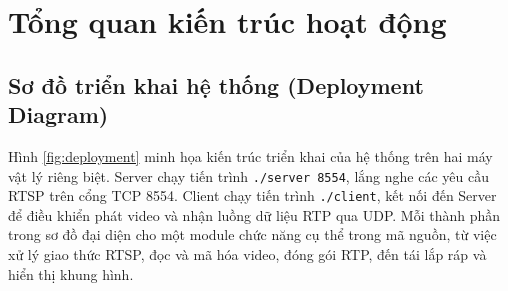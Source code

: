\section{Tổng quan kiến trúc hoạt động}

\subsection{Sơ đồ triển khai hệ thống (Deployment Diagram)}

Hình \ref{fig:deployment} minh họa kiến trúc triển khai của hệ thống trên hai máy vật lý riêng biệt. Server chạy tiến trình \texttt{./server 8554}, lắng nghe các yêu cầu RTSP trên cổng TCP 8554. Client chạy tiến trình \texttt{./client}, kết nối đến Server để điều khiển phát video và nhận luồng dữ liệu RTP qua UDP. Mỗi thành phần trong sơ đồ đại diện cho một module chức năng cụ thể trong mã nguồn, từ việc xử lý giao thức RTSP, đọc và mã hóa video, đóng gói RTP, đến tái lắp ráp và hiển thị khung hình.

